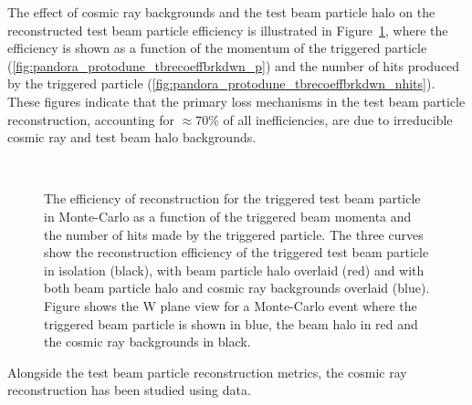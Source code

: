 The effect of cosmic ray backgrounds and the test beam particle halo on the reconstructed test beam particle efficiency is illustrated in Figure~\ref{fig:pandora_protodune_tbrecoeffbrkdwn}, where the efficiency is shown as a function of the momentum of the triggered particle (\ref{fig:pandora_protodune_tbrecoeffbrkdwn_p}) and the number of hits produced by the triggered particle (\ref{fig:pandora_protodune_tbrecoeffbrkdwn_nhits}).  These figures indicate that the primary loss mechanisms in the test beam particle reconstruction, accounting for $\approx 70\%$ of all inefficiencies, are due to irreducible cosmic ray and test beam halo backgrounds.

\begin{figure}[!ht]
\centering
{}
 \\
\caption[Reconstruction efficiency for test beam particle in  per momentum and hits]{The efficiency of reconstruction for the triggered test beam particle in Monte-Carlo as a function of \protect{} the triggered beam momenta and \protect{} the number of hits made by the triggered particle.  The three curves show the reconstruction efficiency of the triggered test beam particle in isolation (black), with beam particle halo overlaid (red) and with both beam particle halo and cosmic ray backgrounds overlaid (blue).  Figure \protect{} shows the W plane view for a Monte-Carlo event where the triggered beam particle is shown in blue, the beam halo in red and the cosmic ray backgrounds in black.}
\label{fig:pandora_protodune_tbrecoeffbrkdwn}
\end{figure}

Alongside the test beam particle reconstruction metrics, the  cosmic ray reconstruction has been studied using  data. 

